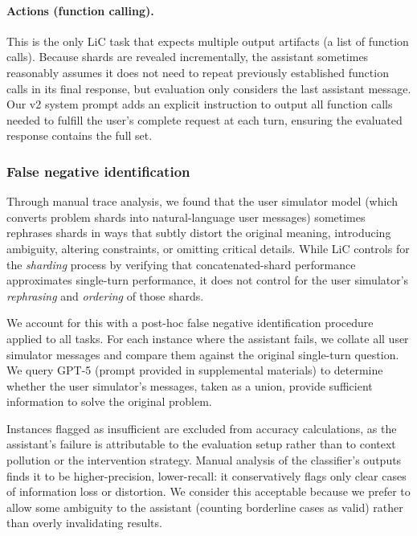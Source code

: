 \documentclass{article}
\begin{document}
\paragraph{Actions (function calling).} This is the only LiC task that expects multiple output artifacts (a list of function calls). Because shards are revealed incrementally, the assistant sometimes reasonably assumes it does not need to repeat previously established function calls in its final response, but evaluation only considers the last assistant message. Our v2 system prompt adds an explicit instruction to output all function calls needed to fulfill the user's complete request at each turn, ensuring the evaluated response contains the full set.

\subsubsection{False negative identification}
\label{app:false-neg}

Through manual trace analysis, we found that the user simulator model (which converts problem shards into natural-language user messages) sometimes rephrases shards in ways that subtly distort the original meaning, introducing ambiguity, altering constraints, or omitting critical details. While LiC controls for the \emph{sharding} process by verifying that concatenated-shard performance approximates single-turn performance, it does not control for the user simulator's \emph{rephrasing} and \emph{ordering} of those shards.

We account for this with a post-hoc false negative identification procedure applied to all tasks. For each instance where the assistant fails, we collate all user simulator messages and compare them against the original single-turn question. We query GPT-5 (prompt provided in supplemental materials) to determine whether the user simulator's messages, taken as a union, provide sufficient information to solve the original problem.

Instances flagged as insufficient are excluded from accuracy calculations, as the assistant's failure is attributable to the evaluation setup rather than to context pollution or the intervention strategy. Manual analysis of the classifier's outputs finds it to be higher-precision, lower-recall: it conservatively flags only clear cases of information loss or distortion. We consider this acceptable because we prefer to allow some ambiguity to the assistant (counting borderline cases as valid) rather than overly invalidating results.
\end{document}

